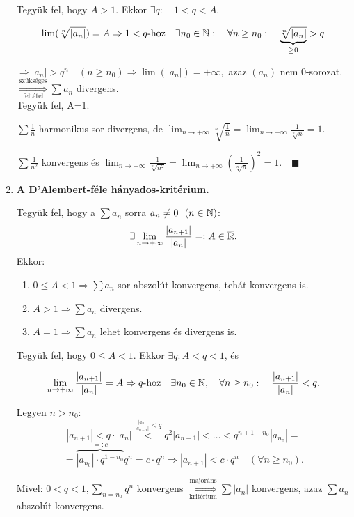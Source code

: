 \documentclass[a4paper,11.5pt]{article}
\begin{document}
\begin{enumerate}
		Tegyük fel, hogy $A>1$. Ekkor $\exists q:\quad 1<q<A$.
		
		\[ \lim(\sqrt[n]{|a_n|})=A \Rightarrow 1<q\text{-hoz}\quad \exists n_0 \in \mathbb{N}: \quad\forall n \geq n_0: \quad\underbrace{\sqrt[n]{|a_n|}}_{\geq 0}>q \]
		
		$\Rightarrow |a_n|>q^n \quad (n\geq n_0) \Rightarrow \lim(|a_n|)=+\infty,$ azaz $(a_n)$ nem 0-sorozat. $\overset{\text{szükséges}}{\underset{\text{feltétel}}{\Longrightarrow}} \sum a_n$ divergens.\\
		
		Tegyük fel, A=1. 
		
		$\displaystyle\sum \frac{1}{n} $ harmonikus sor divergens, de $\displaystyle\lim_{n\to+\infty}\sqrt[n]{\frac{1}{n}}=\lim_{n\to+\infty}\frac{1}{\sqrt[n]{n}}=1.$
		
		$\displaystyle\sum\frac{1}{n^2}$ konvergens és $\displaystyle\lim_{n\to+\infty}\frac{1}{\sqrt[n]{n^2}}=\lim_{n\to+\infty}\left(\frac{1}{\sqrt[n]{n}}\right)^2=1.\quad\blacksquare$
		\pagebreak
		\item \textbf{A D'Alembert-féle hányados-kritérium.} 
		
		Tegyük fel, hogy a $\sum a_n$ sorra $a_n\not=0~~(n\in \mathbb{N})$:
		\[ \exists\lim_{n\to +\infty}\frac{|a_{n+1}|}{|a_n|} =: A\in \overline{\mathbb{R}} .\]
		Ekkor:
		\begin{enumerate}
			\item $0 \leq A <1 \Rightarrow \sum a_n$ sor abszolút konvergens, tehát konvergens is.
			\item $A>1 \Rightarrow \sum a_n$ divergens.
			\item $A=1 \Rightarrow \sum a_n$ lehet konvergens és divergens is.
		\end{enumerate}
		
		\biz Tegyük fel, hogy $0\leq A < 1$. Ekkor $\exists q: A<q<1$, és
		
		\[\displaystyle\lim_{n\to +\infty} \frac{|a_{n+1}|}{|a_n|}=A \Rightarrow q\text{-hoz}\quad\exists n_0 \in \mathbb{N}, \quad \forall n\geq n_0: \quad \frac{|a_{n+1}|}{|a_n|}<q.\]
		
		Legyen $n>n_0$:\quad\[|a_{n+1}|<q\cdot|a_n|\overset{\frac{|a_{n}|}{|a_{n-1}|}<q}{<} q^2|a_{n-1}|< \ldots < q^{n+1-n_0}|a_{n_0}|=\]\[ =\overbrace{|a_{n_0}|\cdot q^{1-n_0}}^{=:c}q^n=c\cdot q^n \Rightarrow |a_{n+1}|< c\cdot q^n \quad(\forall n \geq n_0).\]
		
		Mivel: $0<q<1, \displaystyle\sum_{n=n_0}q^n$ konvergens $\overset{\text{majoráns}}{\underset{\text{kritérium}}{\Longrightarrow}}\sum |a_n|$ konvergens, azaz $\sum a_n$ abszolút konvergens.\\
		

\end{enumerate}
\end{document}
